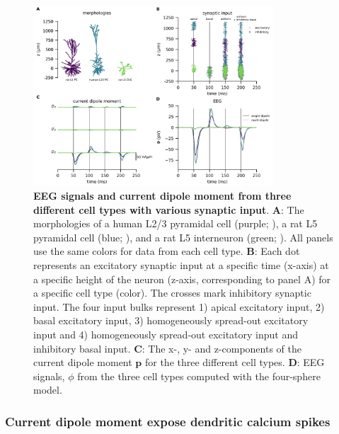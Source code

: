 \documentclass[preprint,10pt,authoryear]{elsarticle}
\newcommand{\tvntxt}[1]{{\color{Emerald}#1}}
\begin{document}
\begin{figure}[H]
	\centering
	\includegraphics[width=0.8\textwidth]{fig_compare_neurons_l5ChC_wmd.png}
	\caption{\textbf{EEG signals and current dipole moment from three different cell types with various synaptic input}.
	\textbf{A}: The morphologies of \tvntxt{a human L2/3 pyramidal cell (purple; \cite{EYAL2016})}, \tvntxt{a rat L5 pyramidal cell} (blue; \cite{HAY2011}), and a \tvntxt{rat L5 interneuron (green; \cite{MARKRAM2015})}. All panels use the same colors for data from each cell type.
	\textbf{B}: Each dot represents an excitatory synaptic input at a specific time (x-axis) at a specific height of the neuron (z-axis, corresponding to panel A) for a specific cell type (color). The crosses mark inhibitory synaptic input. The four input bulks represent 1) apical excitatory input, 2) basal excitatory input, 3) homogeneously spread-out excitatory input and 4) homogeneously spread-out excitatory input and inhibitory basal input.
	\textbf{C}: The x-, y- and z-components of the current dipole moment $\mathbf{p}$ for the three different cell types.
	\textbf{D}: EEG signals, $\phi$ from the three cell types computed with the four-sphere model.
	}
	\label{fig:eeg_compare_cell_types}
\end{figure}


\subsubsection{Current dipole moment expose dendritic calcium spikes}
\end{document}
